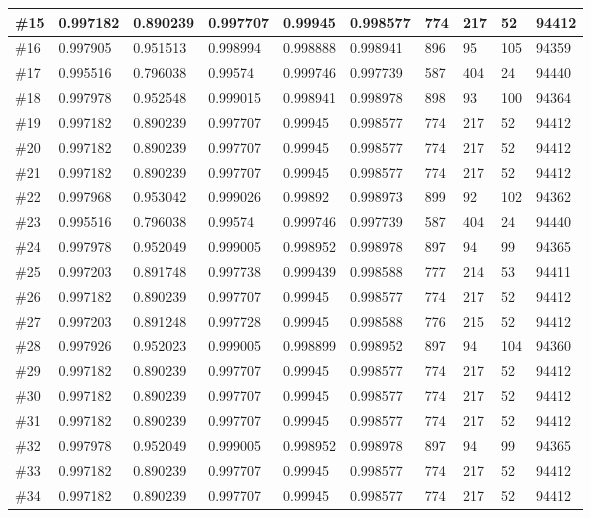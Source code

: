 \begin{longtable}{l|l|l|l|l|l|l|l|l|l}
\#15 & 0.997182 & 0.890239 & 0.997707 & 0.99945  & 0.998577 & 774 & 217 & 52  & 94412 \\ \hline
\#16 & 0.997905 & 0.951513 & 0.998994 & 0.998888 & 0.998941 & 896 & 95  & 105 & 94359 \\ \hline
\#17 & 0.995516 & 0.796038 & 0.99574  & 0.999746 & 0.997739 & 587 & 404 & 24  & 94440 \\ \hline
\#18 & 0.997978 & 0.952548 & 0.999015 & 0.998941 & 0.998978 & 898 & 93  & 100 & 94364 \\ \hline
\#19 & 0.997182 & 0.890239 & 0.997707 & 0.99945  & 0.998577 & 774 & 217 & 52  & 94412 \\ \hline
\#20 & 0.997182 & 0.890239 & 0.997707 & 0.99945  & 0.998577 & 774 & 217 & 52  & 94412 \\ \hline
\#21 & 0.997182 & 0.890239 & 0.997707 & 0.99945  & 0.998577 & 774 & 217 & 52  & 94412 \\ \hline
\#22 & 0.997968 & 0.953042 & 0.999026 & 0.99892  & 0.998973 & 899 & 92  & 102 & 94362 \\ \hline
\#23 & 0.995516 & 0.796038 & 0.99574  & 0.999746 & 0.997739 & 587 & 404 & 24  & 94440 \\ \hline
\#24 & 0.997978 & 0.952049 & 0.999005 & 0.998952 & 0.998978 & 897 & 94  & 99  & 94365 \\ \hline
\#25 & 0.997203 & 0.891748 & 0.997738 & 0.999439 & 0.998588 & 777 & 214 & 53  & 94411 \\ \hline
\#26 & 0.997182 & 0.890239 & 0.997707 & 0.99945  & 0.998577 & 774 & 217 & 52  & 94412 \\ \hline
\#27 & 0.997203 & 0.891248 & 0.997728 & 0.99945  & 0.998588 & 776 & 215 & 52  & 94412 \\ \hline
\#28 & 0.997926 & 0.952023 & 0.999005 & 0.998899 & 0.998952 & 897 & 94  & 104 & 94360 \\ \hline
\#29 & 0.997182 & 0.890239 & 0.997707 & 0.99945  & 0.998577 & 774 & 217 & 52  & 94412 \\ \hline
\#30 & 0.997182 & 0.890239 & 0.997707 & 0.99945  & 0.998577 & 774 & 217 & 52  & 94412 \\ \hline
\#31 & 0.997182 & 0.890239 & 0.997707 & 0.99945  & 0.998577 & 774 & 217 & 52  & 94412 \\ \hline
\#32 & 0.997978 & 0.952049 & 0.999005 & 0.998952 & 0.998978 & 897 & 94  & 99  & 94365 \\ \hline
\#33 & 0.997182 & 0.890239 & 0.997707 & 0.99945  & 0.998577 & 774 & 217 & 52  & 94412 \\ \hline
\#34 & 0.997182 & 0.890239 & 0.997707 & 0.99945  & 0.998577 & 774 & 217 & 52  & 94412 \\ \hline

\end{longtable}
